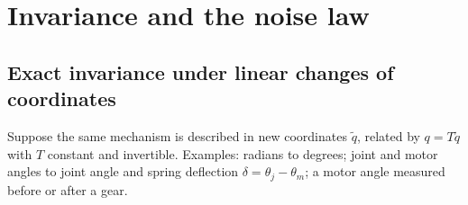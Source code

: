 \documentclass[11pt]{article}
\theoremstyle{definition}
\theoremstyle{remark}
\begin{document}
\section{Invariance and the noise law}
\label{sec:invariance}

\subsection{Exact invariance under linear changes of coordinates}

Suppose the same mechanism is described in new coordinates $\tilde q$, related by
$q=T\tilde q$ with $T$ constant and invertible. Examples: radians to degrees; joint and
motor angles to joint angle and spring deflection $\delta=\theta_j-\theta_m$; a motor
angle measured before or after a gear.
\end{document}
